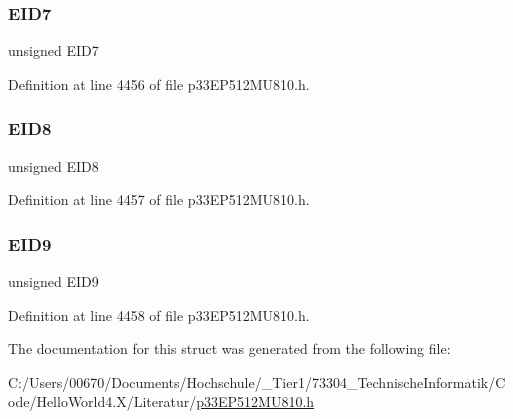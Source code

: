 \subsubsection{\texorpdfstring{E\+I\+D7}{EID7}}
{\footnotesize\ttfamily unsigned E\+I\+D7}



Definition at line 4456 of file p33\+E\+P512\+M\+U810.\+h.

\mbox{\label{structtag_c1_r_x_f12_e_i_d_b_i_t_s_acca25e0b7d86eb499d01f85222baea87}} 
\subsubsection{\texorpdfstring{E\+I\+D8}{EID8}}
{\footnotesize\ttfamily unsigned E\+I\+D8}



Definition at line 4457 of file p33\+E\+P512\+M\+U810.\+h.

\mbox{\label{structtag_c1_r_x_f12_e_i_d_b_i_t_s_ac6748f73d4ada8538b06548be4f396c2}} 
\subsubsection{\texorpdfstring{E\+I\+D9}{EID9}}
{\footnotesize\ttfamily unsigned E\+I\+D9}



Definition at line 4458 of file p33\+E\+P512\+M\+U810.\+h.



The documentation for this struct was generated from the following file\+:\begin{DoxyCompactItemize}
\item 
C\+:/\+Users/00670/\+Documents/\+Hochschule/\+\_\+\+Tier1/73304\+\_\+\+Technische\+Informatik/\+Code/\+Hello\+World4.\+X/\+Literatur/\hyperlink{p33_e_p512_m_u810_8h}{p33\+E\+P512\+M\+U810.\+h}\end{DoxyCompactItemize}
